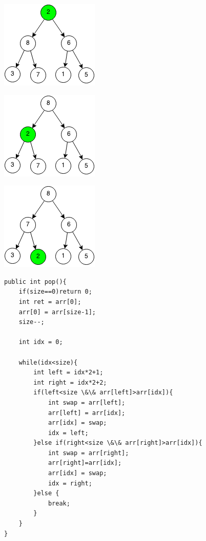\documentclass[11pt,oneside]{book}
\makeatletter
\def\maxwidth#1{\ifdim\Gin@nat@width>#1 #1\else\Gin@nat@width\fi}
\makeatother
\begin{document}
\vspace{5px}\includegraphics[width=\maxwidth{\textwidth}]{maxheappop1.png}

\vspace{5px}\includegraphics[width=\maxwidth{\textwidth}]{maxheappop2.png}

\vspace{5px}\includegraphics[width=\maxwidth{\textwidth}]{maxheappop3.png}

\begin{lstlisting}
public int pop(){
    if(size==0)return 0;
    int ret = arr[0];
    arr[0] = arr[size-1];
    size--;
        
    int idx = 0;
        
    while(idx<size){
        int left = idx*2+1;
        int right = idx*2+2;
        if(left<size \&\& arr[left]>arr[idx]){
            int swap = arr[left];
            arr[left] = arr[idx];
            arr[idx] = swap;
            idx = left;
        }else if(right<size \&\& arr[right]>arr[idx]){
            int swap = arr[right];
            arr[right]=arr[idx];
            arr[idx] = swap;
            idx = right;
        }else {
            break;
        }
    }
}
\end{lstlisting}
\end{document}
